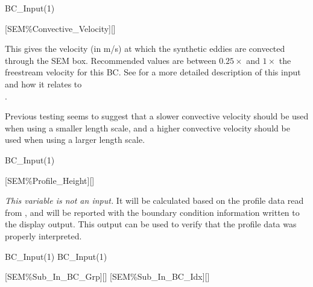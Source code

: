 
\FINALFIX{\newpage}
\begin{nmldescitem}
BC_Input(1)%
\end{nmldescitem}
[SEM\%Convective\_Velocity][]

\begin{nmldescbody}
This gives the velocity (in m\slash s) at which the synthetic eddies are
convected through the SEM box.
%
Recommended values are between $0.25\times$ and $1\times$ the
freestream velocity for this BC.
%
See 
for a more detailed description of this input and how it relates to
\\ %
.

\NOTE
Previous testing seems to suggest that a slower convective velocity
should be used when using a smaller length scale, and a higher convective
velocity should be used when using a larger length scale.
\end{nmldescbody}


\begin{nmldescitem}
BC_Input(1)%
\end{nmldescitem}
[SEM\%Profile\_Height][]

\begin{nmldescbody}
\NOTE
\emph{This variable is not an input.}
%
It will be calculated based on the profile data read from
,
and will be reported with the boundary condition information
written to the display output.
%
This output can be used to verify that the profile data was
properly interpreted.

\end{nmldescbody}


\begin{nmldescitem}
BC_Input(1)%
BC_Input(1)%
\end{nmldescitem}
[SEM\%Sub\_In\_BC\_Grp][]
[SEM\%Sub\_In\_BC\_Idx][]

